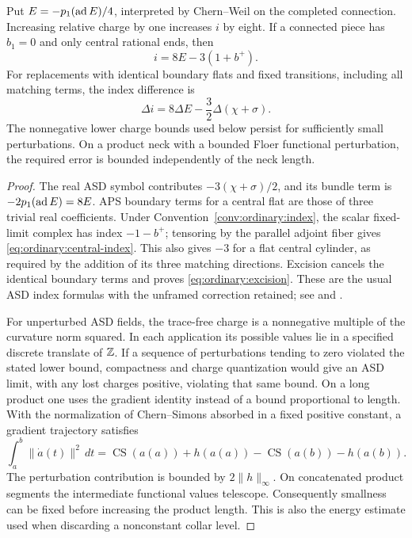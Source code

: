 \begin{lemma}\label{lem:ordinary:index}
Put $E=-p_1(\operatorname{ad} E)/4$, interpreted by Chern--Weil on the completed
connection.  Increasing relative charge by one increases $i$ by eight.
If a connected piece has $b_1=0$ and only central rational ends, then
\begin{equation}\label{eq:ordinary:central-index}
 i=8E-3(1+b^+).
\end{equation}
For replacements with identical boundary flats and fixed transitions,
including all matching terms, the index difference is
\begin{equation}\label{eq:ordinary:excision}
 \Delta i=8\Delta E-\frac32\Delta(\chi+\sigma).
\end{equation}
The nonnegative lower charge bounds used below persist for sufficiently
small perturbations.  On a product neck with a bounded Floer functional
perturbation, the required error is bounded independently of the neck
length.
\end{lemma}
\begin{proof}
The real ASD symbol contributes $-3(\chi+\sigma)/2$, and its bundle
term is $-2p_1(\operatorname{ad} E)=8E$.  APS boundary terms for a central flat are
those of three trivial real coefficients.  Under
Convention~\ref{conv:ordinary:index}, the scalar fixed-limit complex
has index $-1-b^+$; tensoring by the parallel adjoint fiber gives
\eqref{eq:ordinary:central-index}.  This also gives $-3$ for a flat
central cylinder, as required by the addition of its three matching
directions.  Excision cancels the identical boundary terms and proves
\eqref{eq:ordinary:excision}.  These are the usual ASD index formulas
with the unframed correction retained; see \cite{DonaldsonKronheimer1990}
and \cite[Equation (10), p.~24]{DaemiLidmanMillerEismeier2025}.

For unperturbed ASD fields, the trace-free charge is a nonnegative
multiple of the curvature norm squared.  In each application its
possible values lie in a specified discrete translate of $\mathbb Z$.
If a sequence of perturbations tending to zero violated the stated
lower bound, compactness and charge quantization would give an ASD
limit, with any lost charges positive, violating that same bound.
On a long product one uses the gradient identity instead of a bound
proportional to length.  With the normalization of Chern--Simons
absorbed in a fixed positive constant, a gradient trajectory satisfies
\[
 \int_{a}^{b}\|\dot a(t)\|^2\,dt
 =\operatorname{CS}(a(a))+h(a(a))
  -\operatorname{CS}(a(b))-h(a(b)).
\]
The perturbation contribution is bounded by $2\|h\|_\infty$.
On concatenated product segments the intermediate functional values
telescope.  Consequently smallness can be fixed before increasing
the product length.  This is also the energy estimate used when
discarding a nonconstant collar level.
\end{proof}

